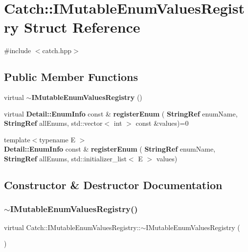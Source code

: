 \section{Catch\+::I\+Mutable\+Enum\+Values\+Registry Struct Reference}
\label{struct_catch_1_1_i_mutable_enum_values_registry}


{\ttfamily \#include $<$catch.\+hpp$>$}

\subsection*{Public Member Functions}
\begin{DoxyCompactItemize}
\item 
virtual \textbf{ $\sim$\+I\+Mutable\+Enum\+Values\+Registry} ()
\item 
virtual \textbf{ Detail\+::\+Enum\+Info} const  \& \textbf{ register\+Enum} (\textbf{ String\+Ref} enum\+Name, \textbf{ String\+Ref} all\+Enums, std\+::vector$<$ int $>$ const \&values)=0
\item 
{\footnotesize template$<$typename E $>$ }\\\textbf{ Detail\+::\+Enum\+Info} const  \& \textbf{ register\+Enum} (\textbf{ String\+Ref} enum\+Name, \textbf{ String\+Ref} all\+Enums, std\+::initializer\+\_\+list$<$ E $>$ values)
\end{DoxyCompactItemize}


\subsection{Constructor \& Destructor Documentation}
\mbox{\label{struct_catch_1_1_i_mutable_enum_values_registry_aebd423693128987c89ac732478d74673}} 
\subsubsection{$\sim$IMutableEnumValuesRegistry()}
{\footnotesize\ttfamily virtual Catch\+::\+I\+Mutable\+Enum\+Values\+Registry\+::$\sim$\+I\+Mutable\+Enum\+Values\+Registry (\begin{DoxyParamCaption}{ }\end{DoxyParamCaption})\hspace{0.3cm}{\ttfamily [virtual]}}



